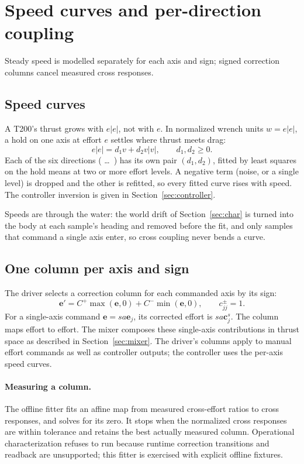 \section{Speed curves and per-direction coupling}
\label{sec:thrust}

Steady speed is modelled separately for each axis and sign; signed correction
columns cancel measured cross responses.

\subsection{Speed curves}

A T200's thrust grows with $e|e|$, not with $e$. In normalized wrench units
$w = e|e|$, a hold on one axis at effort $e$ settles where thrust meets drag:
\[
  e|e| = d_1 v + d_2 v|v| ,\qquad d_1, d_2 \ge 0 .
\]
Each of the six directions ( \dots\ ) has its own pair
$(d_1, d_2)$, fitted by least squares on the hold means at two or more effort
levels. A negative term (noise, or a single level) is dropped and the other is
refitted, so every fitted curve rises with speed. The controller inversion is given
in Section~\ref{sec:controller}.

Speeds are through the water: the world drift of Section~\ref{sec:char} is
turned into the body at each sample's heading and removed before the fit, and
only samples that command a single axis enter, so cross coupling never bends a
curve.

\subsection{One column per axis and sign}

The driver selects a correction column for each commanded axis by its sign:
\[
  \bm e'=C^+\max(\bm e,0)+C^-\min(\bm e,0),\qquad c^{\pm}_{jj}=1.
\]
For a single-axis command $\bm e=s a\bm e_j$, its corrected effort is
$s a\bm c_j^s$. The column maps effort to effort. The mixer composes these
single-axis contributions in thrust space as described in
Section~\ref{sec:mixer}. The driver's columns apply to manual effort commands
as well as controller outputs; the controller uses the per-axis speed curves.

\paragraph{Measuring a column.} The offline fitter fits an affine map from
measured cross-effort ratios to cross responses, and solves for its zero.
It stops when the normalized cross responses are within tolerance and retains
the best actually measured column. Operational characterization refuses to run
because runtime correction transitions and readback are unsupported; this
fitter is exercised with explicit offline fixtures.

